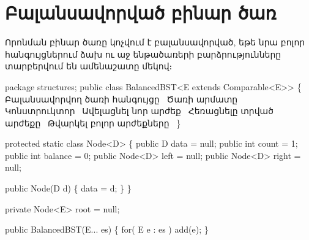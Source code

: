 
%
%
%
\section{Բալանսավորված բինար ծառ}

Որոնման բինար ծառը կոչվում է բալանսավորված, եթե նրա բոլոր 
հանգույցներում ձախ ու աջ ենթածառերի բարձրությունները տարբերվում 
են ամենաշատը մեկով։

\endmoddef{}
package structures;
public class BalancedBST<E extends Comparable<E>> \{
  \LA{}Բալանսավորվող ծառի հանգույցը~{\nwtagstyle{}}\RA{}
  \LA{}Ծառի արմատը~{\nwtagstyle{}}\RA{}
  \LA{}Կոնստրուկտոր~{\nwtagstyle{}}\RA{}
  \LA{}Ավելացնել նոր արժեք~{\nwtagstyle{}}\RA{}
  \LA{}Հեռացնելը տրված արժեքը~{\nwtagstyle{}}\RA{}
  \LA{}Թվարկել բոլոր արժեքները~{\nwtagstyle{}}\RA{}
\}
\nwendcode{}\nwdocspar

\nwenddocs{}\endmoddef{}
protected static class Node<D> \{
  public D data = null;
  public int count = 1;
  public int balance = 0;
  public Node<D> left = null;
  public Node<D> right = null;

  public Node(D d)
  \{
    data = d;
  \}
\}
\nwendcode{}\nwdocspar

\nwenddocs{}\endmoddef{}
private Node<E> root = null;
\nwendcode{}\nwdocspar


\nwenddocs{}\endmoddef{}
public BalancedBST(E... es)
\{
  for( E e : es )
    add(e);
\}
\nwendcode{}\nwdocspar


